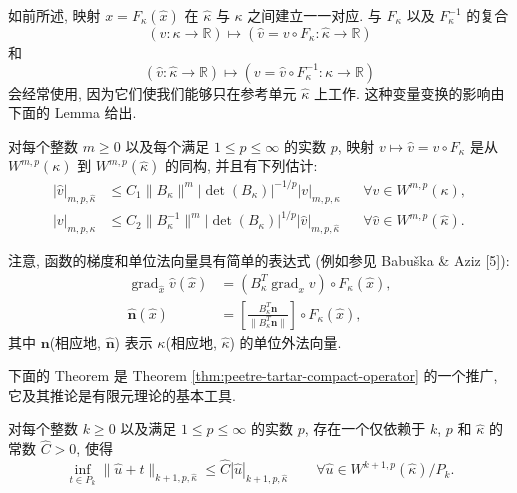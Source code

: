 如前所述, 映射 $x=F_\kappa(\hat x)$ 在 $\hat\kappa$ 与 $\kappa$
之间建立一一对应. 与 $F_\kappa$ 以及 $F_\kappa^{-1}$ 的复合
\[
(v:\kappa\to\mathbb{R})
\longmapsto
(\hat v=v\circ F_\kappa:\hat\kappa\to\mathbb{R})
\]
和
\[
(\hat v:\hat\kappa\to\mathbb{R})
\longmapsto
(v=\hat v\circ F_\kappa^{-1}:\kappa\to\mathbb{R})
\]
会经常使用, 因为它们使我们能够只在参考单元 $\hat\kappa$ 上工作.
这种变量变换的影响由下面的 Lemma 给出.

\setcounter{statement}{0}
\begin{Lemma}\label{lem:appendix-simplex-change-of-variables}
对每个整数 $m\geq0$ 以及每个满足 $1\leq p\leq\infty$ 的实数 $p$,
映射 $v\mapsto\hat v=v\circ F_\kappa$ 是从 $W^{m,p}(\kappa)$
到 $W^{m,p}(\hat\kappa)$ 的同构, 并且有下列估计:
\begin{align}
|\hat v|_{m,p,\hat\kappa}
&\leq
C_1\|B_\kappa\|^m
|\det(B_\kappa)|^{-1/p}|v|_{m,p,\kappa}
&&\forall v\in W^{m,p}(\kappa),
\label{eq:appendix-change-forward}\\
|v|_{m,p,\kappa}
&\leq
C_2\|B_\kappa^{-1}\|^m
|\det(B_\kappa)|^{1/p}|\hat v|_{m,p,\hat\kappa}
&&\forall\hat v\in W^{m,p}(\hat\kappa).
\label{eq:appendix-change-inverse}
\end{align}
\end{Lemma}

注意, 函数的梯度和单位法向量具有简单的表达式
(例如参见 Babuška \& Aziz [5]):
\begin{align}
\operatorname{grad}_{\hat x}\hat v(\hat x)
&=
(B_\kappa^T\operatorname{grad}_x v)\circ F_\kappa(\hat x),
\label{eq:appendix-gradient-transform}\\
\hat{\mathbf n}(\hat x)
&=
\left[
\frac{B_\kappa^T\mathbf n}{\|B_\kappa^T\mathbf n\|}
\right]\circ F_\kappa(\hat x),
\label{eq:appendix-normal-transform}
\end{align}
其中 $\mathbf n$(相应地, $\hat{\mathbf n}$) 表示 $\kappa$(相应地,
$\hat\kappa$) 的单位外法向量.

下面的 Theorem 是 Theorem \ref{thm:peetre-tartar-compact-operator}
的一个推广, 它及其推论是有限元理论的基本工具.

\setcounter{statement}{0}
\begin{Theorem}\label{thm:appendix-bramble-hilbert-general}
对每个整数 $k\geq0$ 以及满足 $1\leq p\leq\infty$ 的实数 $p$,
存在一个仅依赖于 $k$, $p$ 和 $\hat\kappa$ 的常数 $\hat C>0$, 使得
\begin{equation}\label{eq:appendix-bramble-hilbert}
\inf_{t\in P_k}
\|\hat u+t\|_{k+1,p,\hat\kappa}
\leq
\hat C|\hat u|_{k+1,p,\hat\kappa}
\qquad
\forall\hat u\in W^{k+1,p}(\hat\kappa)/P_k.
\end{equation}
\end{Theorem}

